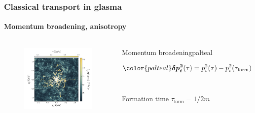 \documentclass[aspectratio=169,11pt,usenames,dvipsnames]{beamer}
\begin{document}
\begin{frame}
\frametitle{Classical transport in glasma}
\framesubtitle{Momentum broadening, anisotropy}
    \begin{columns}[onlytextwidth,t]
            \begin{center}
                \begin{figure}
                    \centering
                    \vspace{-35pt}
                    \includegraphics[width=1.15\textwidth]{images/hqs_trajectories.png}
                \end{figure}
            \end{center}
            \vspace{-10pt}
            \begin{center}
                \begin{custombox2}{Momentum broadening}{palteal}
                    \small
                    \begin{varwidth}{0.92\textwidth}
                    \vspace{-5pt}
                    $${\color{palteal}\boldsymbol{\delta p^2_i}}(\tau)=p^2_i(\tau)-p^2_i(\tau_\mathrm{form})$$
                    \\[-25pt]
                    {\begin{center}\scriptsize\color{lightgray} Formation time $\tau_\mathrm{form}=1/2m$ \end{center}}    

\end{varwidth}
\end{custombox2}
\end{center}
\end{columns}
\end{frame}
\end{document}
